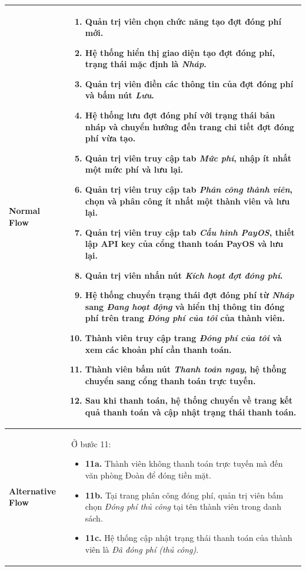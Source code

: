 \begin{longtable}{|m{}|m{}|}
\textbf{Normal Flow} 
& 
\begin{enumerate}
    \item Quản trị viên chọn chức năng tạo đợt đóng phí mới.
    \item Hệ thống hiển thị giao diện tạo đợt đóng phí, trạng thái mặc định là \textit{Nháp}.
    \item Quản trị viên điền các thông tin của đợt đóng phí và bấm nút \textit{Lưu}.
    \item Hệ thống lưu đợt đóng phí với trạng thái bản nháp và chuyển hướng đến trang chi tiết đợt đóng phí vừa tạo.
    \item Quản trị viên truy cập tab \textit{Mức phí}, nhập ít nhất một mức phí và lưu lại.
    \item Quản trị viên truy cập tab \textit{Phân công thành viên}, chọn và phân công ít nhất một thành viên và lưu lại.
    \item Quản trị viên truy cập tab \textit{Cấu hình PayOS}, thiết lập API key của cổng thanh toán PayOS và lưu lại.
    \item Quản trị viên nhấn nút \textit{Kích hoạt đợt đóng phí}.
    \item Hệ thống chuyển trạng thái đợt đóng phí từ \textit{Nháp} sang \textit{Đang hoạt động} và hiển thị thông tin đóng phí trên trang \textit{Đóng phí của tôi} của thành viên.
    \item Thành viên truy cập trang \textit{Đóng phí của tôi} và xem các khoản phí cần thanh toán.
    \item Thành viên bấm nút \textit{Thanh toán ngay}, hệ thống chuyển sang cổng thanh toán trực tuyến.
    \item Sau khi thanh toán, hệ thống chuyển về trang kết quả thanh toán và cập nhật trạng thái thanh toán.
\end{enumerate}
\\ \hline

\textbf{Alternative Flow} 
& Ở bước 11:
\begin{itemize}
    \item \textbf{11a.} Thành viên không thanh toán trực tuyến mà đến văn phòng Đoàn để đóng tiền mặt.
    \item \textbf{11b.} Tại trang phân công đóng phí, quản trị viên bấm chọn \textit{Đóng phí thủ công} tại tên thành viên trong danh sách.
    \item \textbf{11c.} Hệ thống cập nhật trạng thái thanh toán của thành viên là \textit{Đã đóng phí (thủ công)}.
\end{itemize}
\\ \hline


\end{longtable}
